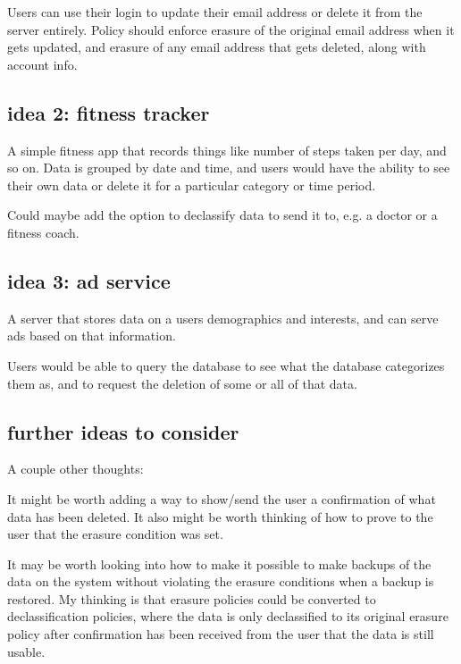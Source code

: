 \documentclass[11pt, oneside]{article}   	%
\begin{document}
Users can use their login to update their email address or delete it from the server entirely. Policy should enforce erasure of the original email address when it gets updated, and erasure of any email address that gets deleted, along with account info.

\subsection{idea 2: fitness tracker}
A simple fitness app that records things like number of steps taken per day, and so on. Data is grouped by date and time, and users would have the ability to see their own data or delete it for a particular category or time period.

Could maybe add the option to declassify data to send it to, e.g. a doctor or a fitness coach.

\subsection{idea 3: ad service}
A server that stores data on a users demographics and interests, and can serve ads based on that information.

Users would be able to query the database to see what the database categorizes them as, and to request the deletion of some or all of that data.

\subsection{further ideas to consider}
A couple other thoughts:

It might be worth adding a way to show/send the user a confirmation of what data has been deleted. It also might be worth thinking of how to prove to the user that the erasure condition was set.

It may be worth looking into how to make it possible to make backups of the data on the system without violating the erasure conditions when a backup is restored.
My thinking is that erasure policies could be converted to declassification policies, where the data is only declassified to its original erasure policy after confirmation has been received from the user that the data is still usable. 
\end{document}
